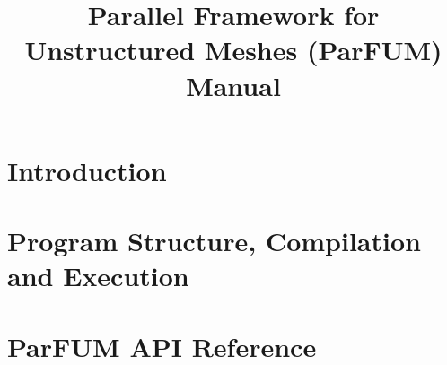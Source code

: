 \documentclass[10pt]{article}
\title{Parallel Framework for Unstructured Meshes (ParFUM) Manual}
\begin{document}
\maketitle

\section{Introduction}
\label{sec:intro}


\section{Program Structure, Compilation and Execution}
\label{sec:program}


\section{ParFUM API Reference}
\label{sec:api}



\end{document}
